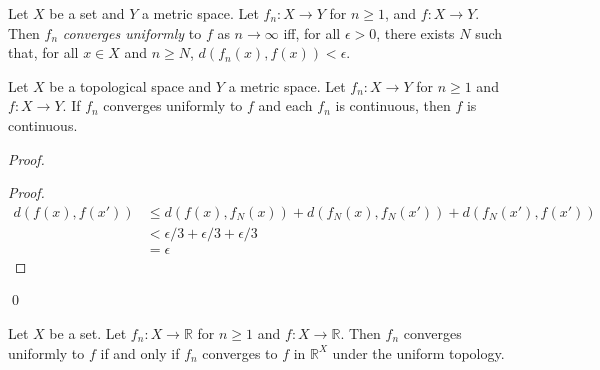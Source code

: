 \begin{df}
  Let $X$ be a set and $Y$ a metric space. Let $f_n : X \rightarrow Y$ for $n
  \geq 1$, and $f : X \rightarrow Y$. Then $f_n$ \emph{converges uniformly}
  to
  $f$ as $n \rightarrow \infty$ iff, for all $\epsilon > 0$, there exists $N$
  such that, for all $x \in X$ and $n \geq N$, $d(f_n(x), f(x)) < \epsilon$.
\end{df}

\begin{thm}
  Let $X$ be a topological space and $Y$ a metric space. Let $f_n : X
  \rightarrow Y$ for $n \geq 1$ and $f : X \rightarrow Y$. If $f_n$ converges
  uniformly to $f$ and each $f_n$ is continuous, then $f$ is continuous.
\end{thm}

\begin{proof}
  \pf
  \begin{proof}
    \pf
    \begin{align*}
      d(f(x), f(x')) & \leq d(f(x), f_N(x)) + d(f_N(x), f_N(x')) + d(f_N(x'),
      f(x')) \\
      & < \epsilon / 3 + \epsilon / 3 + \epsilon / 3 \\
      & = \epsilon
    \end{align*}
  \end{proof}
  \qed
\end{proof}

\begin{lm}
  Let $X$ be a set. Let $f_n : X \rightarrow \mathbb{R}$ for $n \geq 1$ and
  $f : X \rightarrow \mathbb{R}$. Then $f_n$ converges uniformly to $f$ if
  and only if $f_n$ converges to $f$ in $\mathbb{R}^X$ under the uniform
  topology.
\end{lm}

